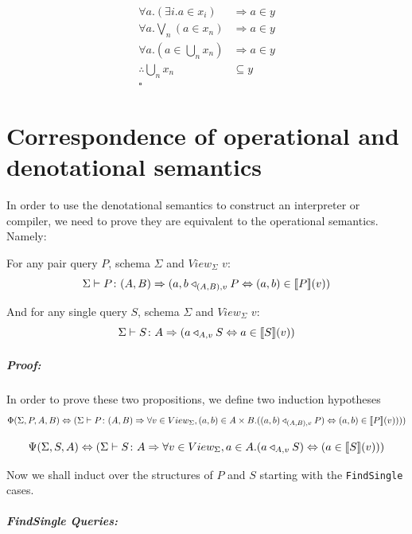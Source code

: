 \documentclass[12pt,a4paper,twoside,openright]{report}
\newcommand\codeName[1]{\texttt{#1}}
\newcommand{\db}[1]{{\bf [\![}#1{\bf ]\!]}}
\newcommand{\deno}[1]{\db{#1}(v)}
\newcommand{\typeRule}[2]{\Sigma\vdash #1 \colon #2}
\newcommand{\denoRule}[2]{#1 \in \deno{#2}}
\newcommand{\opRule}[3]{#1 \triangleleft_{#2, v} #3}
\newcommand{\phiRule}[3]{\Phi(\Sigma, #1, #2, #3)}
\newcommand{\psiRule}[2]{\Psi(\Sigma, #1, #2)}
\begin{document}
\begin{minipage}{\dimexpr\textwidth-1cm}
\begin{equation}
\label{LeastUpperBound}
\begin{split}
\forall a. (\exists i. a \in x_i) & \Rightarrow a \in y \\
\forall a. \bigvee_n (a \in x_n) & \Rightarrow a \in y \\
\forall a. (a \in \bigcup_n x_n) & \Rightarrow a \in y \\
\therefore \bigcup_n x_n & \subseteq y\\
\square
\end{split}
\end{equation}

\xdef\tpd{0pt}
\end{minipage}

\prevdepth\tpd

\chapter{Correspondence of operational and denotational semantics}
\label{DenoOper}
In order to use the denotational semantics to construct an interpreter or compiler, we need to prove they are equivalent to the operational semantics. Namely:

For any pair query $P$, schema $\Sigma$ and $View_{\Sigma}$ $v$:
\[
\typeRule{P}{(A, B)}\Rightarrow \opRule{(a, b}{(A, B)}{P} \Leftrightarrow \denoRule{(a, b)}{P})
\]

And for any single query $S$, schema $\Sigma$ and $View_{\Sigma}$ $v$: 
\[
\typeRule{S}{A}\Rightarrow \opRule{(a}{A}{S} \Leftrightarrow \denoRule{a}{S})
\]

\paragraph{Proof: }In order to prove these two propositions, we define two induction hypotheses
\[
\phiRule{P}{A}{B} \Leftrightarrow (\typeRule{P}{(A, B)} \Rightarrow \forall v \in View_{\Sigma}, (a, b) \in A \times B. (\opRule{(a, b)}{(A, B)}{P}) \Leftrightarrow \denoRule{(a, b)}{P})))
\]

\[
\psiRule{S}{A} \Leftrightarrow (\typeRule{S}{A} \Rightarrow \forall v \in View_{\Sigma}, a \in A. (\opRule{a}{A}{S}) \Leftrightarrow (\denoRule{a}{S}))
\]

Now we shall induct over the structures of $P$ and $S$ starting with the \codeName{FindSingle} cases.

\paragraph{FindSingle Queries:}
\end{document}
